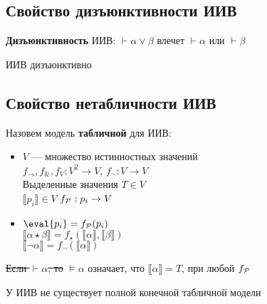 \documentclass[english]{article}
\begin{document}
\subsection{Свойство дизъюнктивности ИИВ}
\label{sec:orgd1d6009}
\begin{definition}
	\textbf{Дизъюнктивность} ИИВ: \(\vdash \alpha \vee \beta\) влечет \(\vdash \alpha\) или \(\vdash \beta\)
	\label{org5d06441}
\end{definition}
\begin{theorem}
	ИИВ дизъюнктивно
	\label{org2fb66c7}
\end{theorem}
\subsection{Свойство нетабличности ИИВ}
\label{sec:org73ba29e}
\begin{definition}
	Назовем модель \textbf{табличной} для ИИВ:
	\begin{itemize}
		\item \(V\) --- множество истинностных значений \\
		      \(f_\to,f_\&, f_V: V^2 \to V\), \(f_\neg: V \to V\) \\
		      Выделенные значения \(T \in V\) \\
		      \(\llbracket p_i \rrbracket \in V\) \(f_\P : p_i \to V\)
		\item \(\eval{p_i} = f_\P(p_i)\) \\
		      \(\llbracket\alpha \star \beta\rrbracket = f_\star(\llbracket\alpha\rrbracket, \llbracket\beta\rrbracket)\) \\
		      \(\llbracket\neg \alpha\rrbracket = f_\neg(\llbracket\alpha\rrbracket)\)
	\end{itemize}
	\sout{Если \(\vdash \alpha\), то} \(\vDash \alpha\) означает, что \(\llbracket\alpha\rrbracket = T\), при любой \(f_\P\)
	\label{orgdc4e189}
\end{definition}
\begin{theorem}
	У ИИВ не существует полной конечной табличной модели
	\label{org04f64c1}
\end{theorem}
\end{document}
